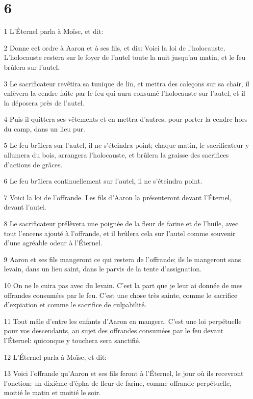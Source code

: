 \chapter{6}

\par 1 L'Éternel parla à Moïse, et dit:
\par 2 Donne cet ordre à Aaron et à ses fils, et dis: Voici la loi de l'holocauste. L'holocauste restera sur le foyer de l'autel toute la nuit jusqu'au matin, et le feu brûlera sur l'autel.
\par 3 Le sacrificateur revêtira sa tunique de lin, et mettra des caleçons sur sa chair, il enlèvera la cendre faite par le feu qui aura consumé l'holocauste sur l'autel, et il la déposera près de l'autel.
\par 4 Puis il quittera ses vêtements et en mettra d'autres, pour porter la cendre hors du camp, dans un lieu pur.
\par 5 Le feu brûlera sur l'autel, il ne s'éteindra point; chaque matin, le sacrificateur y allumera du bois, arrangera l'holocauste, et brûlera la graisse des sacrifices d'actions de grâces.
\par 6 Le feu brûlera continuellement sur l'autel, il ne s'éteindra point.
\par 7 Voici la loi de l'offrande. Les fils d'Aaron la présenteront devant l'Éternel, devant l'autel.
\par 8 Le sacrificateur prélèvera une poignée de la fleur de farine et de l'huile, avec tout l'encens ajouté à l'offrande, et il brûlera cela sur l'autel comme souvenir d'une agréable odeur à l'Éternel.
\par 9 Aaron et ses fils mangeront ce qui restera de l'offrande; ils le mangeront sans levain, dans un lieu saint, dans le parvis de la tente d'assignation.
\par 10 On ne le cuira pas avec du levain. C'est la part que je leur ai donnée de mes offrandes consumées par le feu. C'est une chose très sainte, comme le sacrifice d'expiation et comme le sacrifice de culpabilité.
\par 11 Tout mâle d'entre les enfants d'Aaron en mangera. C'est une loi perpétuelle pour vos descendants, au sujet des offrandes consumées par le feu devant l'Éternel: quiconque y touchera sera sanctifié.
\par 12 L'Éternel parla à Moïse, et dit:
\par 13 Voici l'offrande qu'Aaron et ses fils feront à l'Éternel, le jour où ils recevront l'onction: un dixième d'épha de fleur de farine, comme offrande perpétuelle, moitié le matin et moitié le soir.
